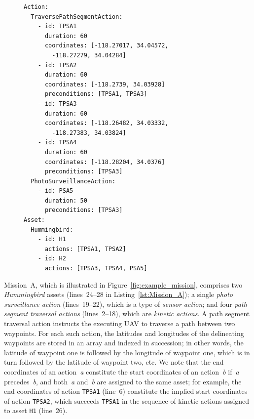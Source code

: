 \begin{figure}[ht]
\begin{lstlisting}[caption={YAML code for Mission~A},label=lst:Mission_A]
Action:
  TraversePathSegmentAction:
    - id: TPSA1
      duration: 60
      coordinates: [-118.27017, 34.04572,
        -118.27279, 34.04284]
    - id: TPSA2
      duration: 60
      coordinates: [-118.2739, 34.03928]
      preconditions: [TPSA1, TPSA3]
    - id: TPSA3
      duration: 60
      coordinates: [-118.26482, 34.03332,
        -118.27383, 34.03824]
    - id: TPSA4
      duration: 60
      coordinates: [-118.28204, 34.0376]
      preconditions: [TPSA3]
  PhotoSurveillanceAction:
    - id: PSA5
      duration: 50
      preconditions: [TPSA3]
Asset:
  Hummingbird:
    - id: H1
      actions: [TPSA1, TPSA2]
    - id: H2
      actions: [TPSA3, TPSA4, PSA5]
\end{lstlisting}
\end{figure}

Mission~A, which is illustrated in Figure~\ref{fig:example_mission}, comprises two \emph{Hummingbird} assets (lines~24--28 in Listing~\ref{lst:Mission_A}); a single \emph{photo surveillance action} (lines~19--22), which is a type of \emph{sensor action}; and four \emph{path segment traversal actions} (lines~2--18), which are \emph{kinetic actions}. A path segment traversal action instructs the executing UAV to traverse a path between two waypoints. For each such action, the latitudes and longitudes of the delineating waypoints are stored in an array and indexed in succession; in other words, the latitude of waypoint one is followed by the longitude of waypoint one, which is in turn followed by the latitude of waypoint two, etc. We note that the end coordinates of an action~\emph{a} constitute the start coordinates of an action~\emph{b} if~\emph{a} precedes~\emph{b}, and both~\emph{a} and~\emph{b} are assigned to the same asset; for example, the end coordinates of action \texttt{TPSA1} (line~6) constitute the implied start coordinates of action \texttt{TPSA2}, which succeeds \texttt{TPSA1} in the sequence of kinetic actions assigned to asset \texttt{H1} (line~26).

